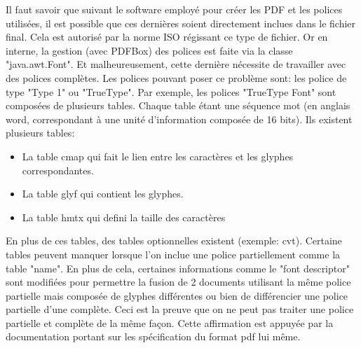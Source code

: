 Il faut savoir que suivant le software employé pour créer les PDF et
les polices utilisées, il est possible que ces dernières soient directement
inclues dans le fichier final. Cela est autorisé par la norme ISO régissant 
ce type de fichier. Or en interne, la gestion (avec PDFBox) des polices est faite via la 
classe "java.awt.Font". Et malheureusement, cette dernière nécessite de travailler
avec des polices complètes.  Les polices pouvant poser ce problème sont: les police de type "Type 1" ou
"TrueType".
Par exemple, les polices "TrueType Font" sont composées de plusieurs tables. Chaque 
table étant une séquence mot (en anglais word, correspondant à une unité d'information composée de 
16 bits). Ils existent plusieurs tables:
\begin{itemize}
\item La table cmap qui fait le lien entre les caractères et les glyphes correspondantes.
\item La table glyf qui contient les glyphes.
\item La table hmtx qui defini la taille des caractères
\end{itemize}
En plus de ces tables, des tables optionnelles existent (exemple: cvt).
Certaine tables peuvent manquer lorsque l'on inclue une police partiellement comme la table "name".
En plus de cela, certaines informations comme le "font descriptor" sont modifiées pour permettre la fusion de 2 documents
utilisant la même police partielle mais composée de glyphes différentes ou bien de différencier une police partielle d'une complète.
Ceci est la preuve que on ne peut pas traiter une police partielle et complète de la même façon. Cette affirmation est appuyée par
la documentation portant sur les spécification du format pdf lui même.

